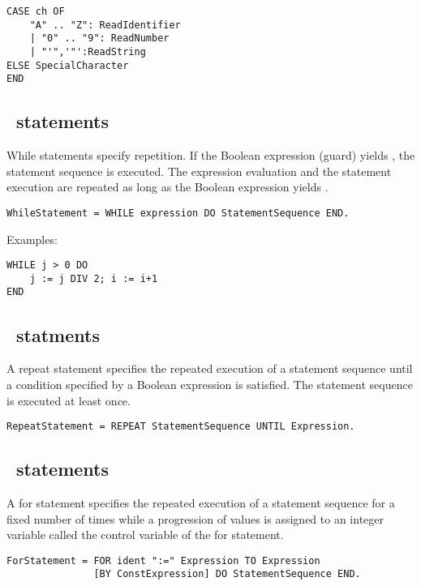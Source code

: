 \documentclass[12pt]{article}
\begin{document}
\begin{lstlisting}[style=example]
CASE ch OF
    "A" .. "Z": ReadIdentifier
    | "0" .. "9": ReadNumber 
    | "'",'"':ReadString 
ELSE SpecialCharacter 
END    
\end{lstlisting}

\subsection{\WHILE\ statements}

While statements specify repetition. If the Boolean expression (guard) yields \TRUE, the statement sequence is executed. The expression evaluation and the statement execution are repeated as long as the Boolean expression yields \TRUE.

\begin{lstlisting}[style=ebnf]
WhileStatement = WHILE expression DO StatementSequence END.
\end{lstlisting} 
    
Examples:
    
\begin{lstlisting}[style=example]
WHILE j > 0 DO
    j := j DIV 2; i := i+1
END
\end{lstlisting} 

\subsection{\REPEAT\ statments}

A repeat statement specifies the repeated execution of a statement sequence until a condition specified by a Boolean expression is satisfied. The statement sequence is executed at least once.

\begin{lstlisting}[style=ebnf]
RepeatStatement = REPEAT StatementSequence UNTIL Expression.
\end{lstlisting} 

\subsection{\FOR\ statements}

A for statement specifies the repeated execution of a statement sequence for a fixed number of times while a progression of values is assigned to an integer variable called the control variable of the for statement.

\begin{lstlisting}[style=ebnf]
ForStatement = FOR ident ":=" Expression TO Expression 
               [BY ConstExpression] DO StatementSequence END.
\end{lstlisting} 
\end{document}
